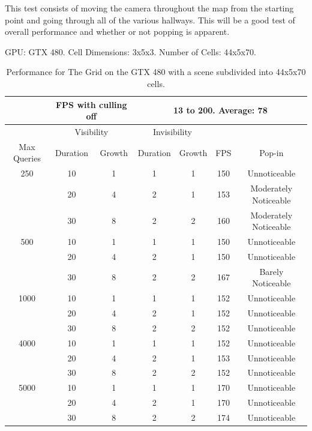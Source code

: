 \documentclass[12pt]{ucthesis}
\newcommand{\captionfonts}{\small\bf\ssp}
\begin{document}
This test consists of moving the camera throughout the map from the starting point and going through all of the various hallways.
This will be a good test of overall performance and whether or not popping is apparent.

\begin{table}
\begin{center}
GPU: GTX 480.   Cell Dimensions: 3x5x3.   Number of Cells: 44x5x70.
\begin{tabular}{|c|c|c|c|c|c|c|}
\hline
&\multicolumn{2}{c|}{FPS with culling off}&\multicolumn{4}{c|}{13 to 200.  Average: 78}
\tabularnewline
\hline 
&\multicolumn{2}{c|}{Visibility}&\multicolumn{2}{c|}{Invisibility}&&
\tabularnewline
Max Queries&Duration&Growth&Duration&Growth&FPS&Pop-in
\tabularnewline
\hline
250 & 10& 1& 1& 1& 150& Unnoticeable
\tabularnewline
     & 20& 4& 2& 1& 153& Moderately Noticeable
\tabularnewline
     & 30& 8& 2& 2& 160& Moderately Noticeable
\tabularnewline
\hline
500 & 10& 1& 1& 1& 150& Unnoticeable
\tabularnewline
     & 20& 4& 2& 1& 150& Unnoticeable
\tabularnewline
     & 30& 8& 2& 2& 167& Barely Noticeable
\tabularnewline
\hline
1000 & 10& 1& 1& 1& 152& Unnoticeable
\tabularnewline
     & 20& 4& 2& 1& 152& Unnoticeable
\tabularnewline
     & 30& 8& 2& 2& 152& Unnoticeable
\tabularnewline
\hline
4000 & 10& 1& 1& 1& 152& Unnoticeable
\tabularnewline
     & 20& 4& 2& 1& 153& Unnoticeable
\tabularnewline
     & 30& 8& 2& 2& 152& Unnoticeable
\tabularnewline
\hline
5000 & 10& 1& 1& 1& 170& Unnoticeable
\tabularnewline
     & 20& 4& 2& 1& 170& Unnoticeable
\tabularnewline
     & 30& 8& 2& 2& 174& Unnoticeable
\tabularnewline
\hline 
\end{tabular}
\captionfonts
\caption[Performance for The Grid]{Performance for The Grid on the GTX 480 with a scene subdivided into 44x5x70 cells.}
\label{table:the-grid-performance-a}
\end{center}
\end{table}
\end{document}
